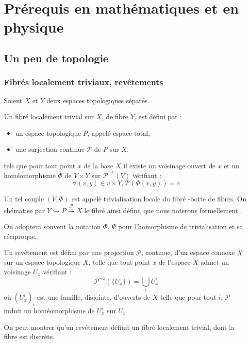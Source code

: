 \chapter{Pr\'erequis en math\'ematiques et en physique}

\section{Un peu de topologie}\label{an_y}

\subsection{Fibr\'es localement triviaux, rev\^etements}

\begin{defi}
Soient $X$ et $Y$ deux espaces topologiques s\'epar\'es.

\par
Un fibr\'e localement trivial sur $X$, de fibre $Y$, est d\'efini par :
\begin{itemize}
\item un espace topologique $P$, appel\'e espace total,%
\item une surjection continue $\mathcal{P}$ de $P$ sur $X$, %
\end{itemize}
tels que pour tout point $x$ de la base $X$ %
il existe un voisinage ouvert de $x$ et un hom\'eomorphisme $\Phi$ de $V\times Y$ sur $\mathcal{P}^{-1}(V)$ v\'erifiant :
\[\forall (v,y)\in v\times Y , \mathcal{P}(\Phi (v,y))=v\]

Un tel couple $(V, \Phi)$ est appel\'e trivialisation locale du fibr\'e -botte de fibres. %
On sh\'ematise par $Y \hookrightarrow P \overset{\mathcal{P}}{\twoheadrightarrow} X$ le fibr\'e ainsi d\'efini, %
que nous noterons formellement \Fiy.

\par
On adoptera souvent la notation $\Phi$, $\Psi$ pour l'homorphisme de trivialisation et sa r\'eciproque.
\end{defi}

\begin{exem}
Un rev\^etement est d\'efini par une projection $\mathcal{P}$, continue, d'un espace connexe $\tilde{X}$ sur un espace topologique $X$, %
telle que tout point $x$ de l'espace $X$ admet un voisinage $U_x$ v\'erifiant :
\[\mathcal{P}^{-1}(\{U_x\})=\underset{i}{\bigcup}U_x^i\]
o\`u $(U_x^i)_i$ est une famille, disjointe, d'ouverts de $\tilde{X}$ telle que pour tout $i$, $\mathcal{P}$ induit un hom\'eomorphisme de $U_x^i$ sur $U_x$.

On peut montrer qu'un rev\^etement d\'efinit un fibr\'e localement trivial, dont la fibre est discr\`ete.
\end{exem}

